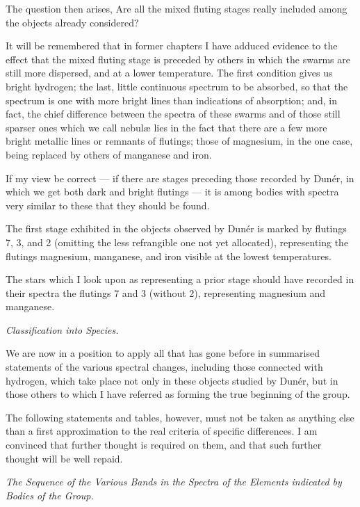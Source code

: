 \documentclass[a4paper, 12pt, oneside, polutonikogreek, english]{article}
\begin{document}
The question then arises, Are all the mixed fluting stages really included among the objects already considered?

It will be remembered that in former chapters I have adduced evidence to the effect that the mixed fluting stage is preceded by others in which the swarms are still more dispersed, and at a lower temperature. The first condition gives us bright hydrogen; the last, little continuous spectrum to be absorbed, so that the spectrum is one with more bright lines than indications of absorption; and, in fact, the chief difference between the spectra of these swarms and of those still sparser ones which we call nebulæ lies in the fact that there are a few more bright metallic lines or remnants of flutings; those of magnesium, in the one case, being replaced by others of manganese and iron.

If my view be correct --- if there are stages preceding those recorded by Dunér, in which we get both dark and bright flutings --- it is among bodies with spectra very similar to these that they should be found.

The first stage exhibited in the objects observed by Dunér is marked by flutings 7, 3, and 2 (omitting the less refrangible one not yet allocated), representing the flutings magnesium, manganese, and iron visible at the lowest temperatures.

The stars which I look upon as representing a prior stage should have recorded in their spectra the flutings 7 and 3 (without 2), representing magnesium and manganese.

\emph{Classification into Species.}

We are now in a position to apply all that has gone before in summarised statements of the various spectral changes, including those connected with hydrogen, which take place not only in these objects studied by Dunér, but in those others to which I have referred as forming the true beginning of the group.

The following statements and tables, however, must not be taken as anything else than a first approximation to the real criteria of specific differences. I am convinced that further thought is required on them, and that such further thought will be well repaid.

\emph{The Sequence of the Various Bands in the Spectra of the Elements indicated by Bodies of the Group.}
\end{document}

